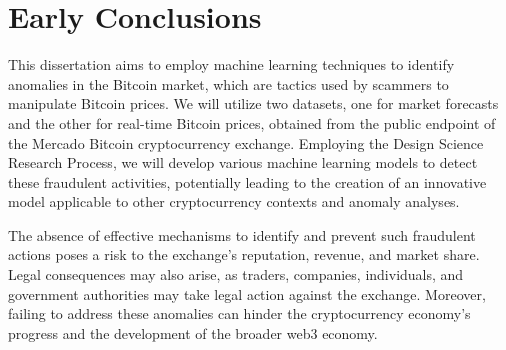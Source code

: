 \section{Early Conclusions}
This dissertation aims to employ machine learning techniques to identify anomalies in the Bitcoin market, which are
tactics used by scammers to manipulate Bitcoin prices. We will utilize two datasets, one for market forecasts and the
other for real-time Bitcoin prices, obtained from the public endpoint of the Mercado Bitcoin cryptocurrency exchange.
Employing the Design Science Research Process, we will develop various machine learning models to detect these
fraudulent activities, potentially leading to the creation of an innovative model applicable to other cryptocurrency
contexts and anomaly analyses.

The absence of effective mechanisms to identify and prevent such fraudulent actions poses a risk to the exchange's
reputation, revenue, and market share. Legal consequences may also arise, as traders, companies, individuals, and
government authorities may take legal action against the exchange. Moreover, failing to address these anomalies can
hinder the cryptocurrency economy's progress and the development of the broader web3 economy.

